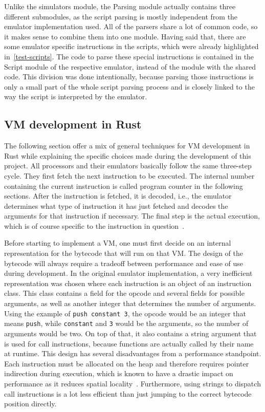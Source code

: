 Unlike the simulators module, the Parsing module actually contains three different submodules, as the script parsing is mostly independent from the emulator implementation used.
All of the parsers share a lot of common code, so it makes sense to combine them into one module.
Having said that, there are some emulator specific instructions in the scripts, which were already highlighted in~\cref{test-scripts}.
The code to parse these special instructions is contained in the Script module of the respective emulator, instead of the module with the shared code.
This division was done intentionally, because parsing those instructions is only a small part of the whole script parsing process and is closely linked to the way the script is interpreted by the emulator.

\subsection{VM development in Rust} \label{rust-vm-dev}
The following section offer a mix of general techniques for VM development in Rust while explaining the specific choices made during the development of this project.
All processors and their emulators basically follow the same three-step cycle.
They first fetch the next instruction to be executed.
The internal number containing the current instruction is called program counter in the following sections.
After the instruction is fetched, it is decoded, i.e., the emulator determines what type of instruction it has just fetched and decodes the arguments for that instruction if necessary.
The final step is the actual execution, which is of course specific to the instruction in question~\cite{nystrom2021crafting}.

\label{bytecode-implementation}
Before starting to implement a VM, one must first decide on an internal representation for the bytecode that will run on that VM.
The design of the bytecode will always require a tradeoff between performance and ease of use during development.
In the original emulator implementation, a very inefficient representation was chosen where each instruction is an object of an instruction class.
This class contains a field for the opcode and several fields for possible arguments, as well as another integer that determines the number of arguments.
Using the example of \verb+push constant 3+, the opcode would be an integer that means \verb+push+, while \verb+constant+ and \verb+3+ would be the arguments, so the number of arguments would be two.
On top of that, it also contains a string argument that is used for call instructions, because functions are actually called by their name at runtime.
This design has several disadvantages from a performance standpoint.
Each instruction must be allocated on the heap and therefore requires pointer indirection during execution, which is known to have a drastic impact on performance as it reduces spatial locality~\cite{6498541}.
Furthermore, using strings to dispatch call instructions is a lot less efficient than just jumping to the correct bytecode position directly.

